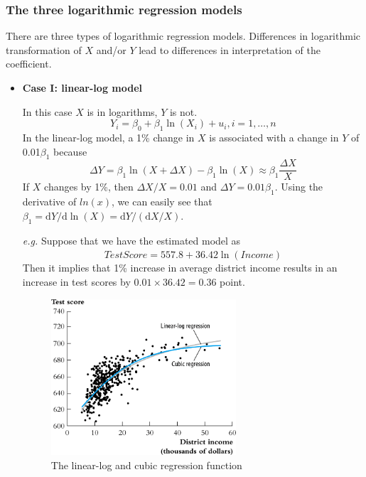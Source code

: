 \documentclass[a4paper,11pt]{article}
\newcommand{\dx}{\mathrm{d}}
\begin{document}
\subsubsection*{The three logarithmic regression models}
\label{sec:orgd330a0e}
There are three types of logarithmic regression models. Differences in
logarithmic transformation of \(X\) and/or \(Y\) lead to differences in
interpretation of the coefficient.

\begin{itemize}
\item \textbf{Case I: linear-log model}
\label{sec:org676fb5d}

In this case \(X\) is in logarithms, \(Y\) is not.
\begin{equation}
\label{eq:linear-log}
Y_i = \beta_0 + \beta_1 \ln(X_i) + u_i, i = 1, \ldots, n
\end{equation}
In the linear-log model, a 1\% change in \(X\) is associated with a
change in \(Y\) of 0.01\(\beta_{\text{1}}\) because
\[ \Delta Y = \beta_1 \ln(X + \Delta X) - \beta_1 \ln(X) \approx
\beta_1 \frac{\Delta X}{X} \]
If \(X\) changes by 1\%, then \(\Delta X/X = 0.01\) and \(\Delta Y =
0.01\beta_1\). Using the derivative of \(ln(x)\), we can easily see that
\(\beta_1 = \dx Y/\dx \ln(X) = \dx Y / (\dx X/X)\).

\emph{e.g.} Suppose that we have the estimated model as
\[\widehat{TestScore} = 557.8 + 36.42\ln(Income)\]
Then it implies that 1\% increase in average district income results in an
increase in test scores by \(0.01 \times 36.42 = 0.36\) point.

\begin{figure}[htbp]
\centering
\includegraphics[width=0.65\textwidth]{img/fig-8-5.png}
\caption{\label{fig:org3d5c690}
The linear-log and cubic regression function}
\end{figure}


\end{itemize}
\end{document}
